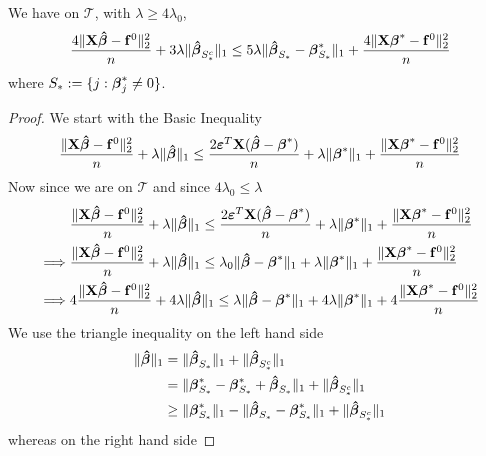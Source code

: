 \begin{lemma}
    We have on $\mathscr{T}$, with $\lambda \geq 4 \lambda_{0}$,
    \begin{equation}
        \label{eqn: new version of lemma 6.3.}
        \frac{4 \|\mathbf{X} \boldsymbol{\hat{\beta}}-\mathbf{f}^0\|_{2}^{2}}{n} + 3 \lambda \| \boldsymbol{\hat{\beta}}_{S^{c}_{*}} \|_{1} \leq 5 \lambda \| \boldsymbol{\hat{\beta}}_{S_{*}} - \boldsymbol{\beta}_{S_{*}}^{*} \|_{1} + \frac{4 \|\mathbf{X} \boldsymbol{\beta}^{*} - \mathbf{f}^{0} \|_{2}^{2}}{n}
    \end{equation}
    where $S_* := \{ j: \boldsymbol{\beta}_j^* \neq 0 \}$.
\end{lemma}
\begin{proof}
    We start with the Basic Inequality
    $$
        \frac{\|\mathbf{X} \boldsymbol{\hat{\beta}} - \mathbf{f}^0 \|_{2}^{2}}{n} + \lambda\| \boldsymbol{\hat{\beta}} \|_{1} \leq  \frac{2 \boldsymbol{\varepsilon}^T \mathbf{X} (\boldsymbol{\hat{\beta}} - \boldsymbol{\beta}^*)}{n} + \lambda \| \boldsymbol{\beta}^*\|_{1} + \frac{\|\mathbf{X} \boldsymbol{\beta}^* - \mathbf{f}^0\|_{2}^{2}}{n}
    $$
    Now since we are on $\mathscr{T}$ and since $4 \lambda_0 \leq \lambda$
    \begin{align*}
                 & \frac{\|\mathbf{X} \boldsymbol{\hat{\beta}} - \mathbf{f}^0 \|_{2}^{2}}{n} + \lambda\| \boldsymbol{\hat{\beta}} \|_{1} \leq  \frac{2 \boldsymbol{\varepsilon}^T \mathbf{X} (\boldsymbol{\hat{\beta}} - \boldsymbol{\beta}^*)}{n} + \lambda \| \boldsymbol{\beta}^*\|_{1} + \frac{\|\mathbf{X} \boldsymbol{\beta}^* - \mathbf{f}^0\|_{2}^{2}}{n} \\
        \implies &
        \frac{\|\mathbf{X} \boldsymbol{\hat{\beta}} - \mathbf{f}^0 \|_{2}^{2}}{n} + \lambda\| \boldsymbol{\hat{\beta}} \|_{1} \leq \lambda_0 \| \boldsymbol{\hat{\beta}} - \boldsymbol{\beta}^* \|_{1} + \lambda \| \boldsymbol{\beta}^*\|_{1} + \frac{\|\mathbf{X} \boldsymbol{\beta}^* - \mathbf{f}^0\|_{2}^{2}}{n}                 \\
        \implies &
        4 \frac{\| \mathbf{X} \boldsymbol{\hat{\beta}} - \mathbf{f}^0 \|_{2}^{2}}{n} + 4 \lambda\| \boldsymbol{\hat{\beta}} \|_{1} \leq \lambda \| \boldsymbol{\hat{\beta}} - \boldsymbol{\beta}^* \|_{1} + 4 \lambda \| \boldsymbol{\beta}^*\|_{1} + 4\frac{\|\mathbf{X} \boldsymbol{\beta}^* - \mathbf{f}^0\|_{2}^{2}}{n}           \\
    \end{align*}
    We use the triangle inequality on the left hand side
    \begin{align*}
        \|\boldsymbol{\hat{\beta}}\|_{1}
         & = \|\boldsymbol{\hat{\beta}}_{S_{*}} \|_{1} + \|\boldsymbol{\hat{\beta}}_{S_{*}^{c}} \|_{1}                                                \\
         & = \|\boldsymbol{\beta}_{S_{*}}^{*} - \boldsymbol{\beta}_{S_{*}}^{*} + \boldsymbol{\hat{\beta}}_{S_{*}} \|_{1} + \|\boldsymbol{\hat{\beta}}_{S_{*}^{c}} \|_{1}          \\
         & \geq \|\boldsymbol{\beta}_{S_{*}}^{*} \|_{1} - \|\boldsymbol{\hat{\beta}}_{S_{*}}-\boldsymbol{\beta}_{S_{*}}^{*} \|_{1}+ \|\boldsymbol{\hat{\beta}}_{S_{*}^{c}} \|_{1}
    \end{align*}
    whereas on the right hand side

\end{proof}
